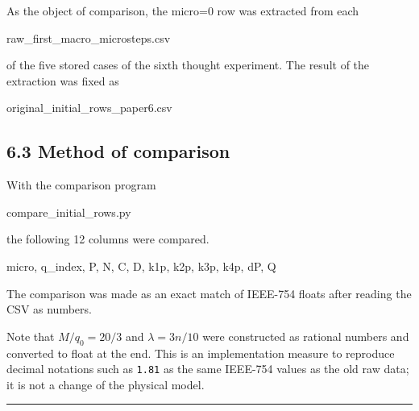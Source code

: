 \documentclass[
  a4paper,
]{article}
\newenvironment{Shaded}{}{}
\newcommand{\NormalTok}[1]{#1}
\begin{document}
As the object of comparison, the micro=0 row was extracted from each

\begin{Shaded}
\begin{Highlighting}[]
\NormalTok{raw\_first\_macro\_microsteps.csv}
\end{Highlighting}
\end{Shaded}

of the five stored cases of the sixth thought experiment. The result of
the extraction was fixed as

\begin{Shaded}
\begin{Highlighting}[]
\NormalTok{original\_initial\_rows\_paper6.csv}
\end{Highlighting}
\end{Shaded}

\subsection{6.3 Method of comparison}\label{method-of-comparison}

With the comparison program

\begin{Shaded}
\begin{Highlighting}[]
\NormalTok{compare\_initial\_rows.py}
\end{Highlighting}
\end{Shaded}

the following 12 columns were compared.

\begin{Shaded}
\begin{Highlighting}[]
\NormalTok{micro, q\_index, P, N, C, D,}
\NormalTok{k1p, k2p, k3p, k4p, dP, Q}
\end{Highlighting}
\end{Shaded}

The comparison was made as an exact match of IEEE-754 floats after
reading the CSV as numbers.

Note that \(M/q_0=20/3\) and \(\lambda=3n/10\) were constructed as
rational numbers and converted to float at the end. This is an
implementation measure to reproduce decimal notations such as
\texttt{1.81} as the same IEEE-754 values as the old raw data; it is not
a change of the physical model.

\begin{center}\rule{0.5\linewidth}{0.5pt}\end{center}
\end{document}
